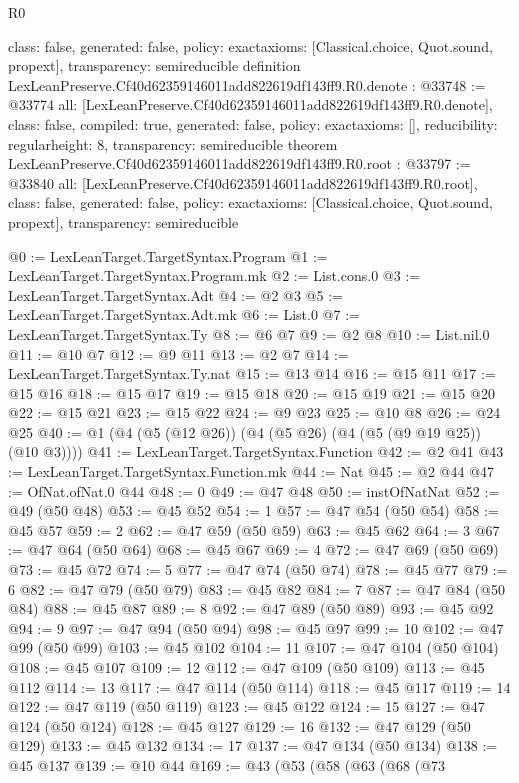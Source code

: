 \begin{lexlean}{R0}
\begin{coremodule}
{  class: false,
  generated: false,
  policy: exact{axioms: [Classical.choice, Quot.sound, propext]},
  transparency: semireducible
}
definition LexLeanPreserve.Cf40d62359146011add822619df143ff9.R0.denote : @33748 := @33774 {
  all: [LexLeanPreserve.Cf40d62359146011add822619df143ff9.R0.denote],
  class: false,
  compiled: true,
  generated: false,
  policy: exact{axioms: []},
  reducibility: regular{height: 8},
  transparency: semireducible
}
theorem LexLeanPreserve.Cf40d62359146011add822619df143ff9.R0.root : @33797 := @33840 {
  all: [LexLeanPreserve.Cf40d62359146011add822619df143ff9.R0.root],
  class: false,
  generated: false,
  policy: exact{axioms: [Classical.choice, Quot.sound, propext]},
  transparency: semireducible
}

@0 := LexLeanTarget.TargetSyntax.Program
@1 := LexLeanTarget.TargetSyntax.Program.mk
@2 := List.cons.{0}
@3 := LexLeanTarget.TargetSyntax.Adt
@4 := @2 @3
@5 := LexLeanTarget.TargetSyntax.Adt.mk
@6 := List.{0}
@7 := LexLeanTarget.TargetSyntax.Ty
@8 := @6 @7
@9 := @2 @8
@10 := List.nil.{0}
@11 := @10 @7
@12 := @9 @11
@13 := @2 @7
@14 := LexLeanTarget.TargetSyntax.Ty.nat
@15 := @13 @14
@16 := @15 @11
@17 := @15 @16
@18 := @15 @17
@19 := @15 @18
@20 := @15 @19
@21 := @15 @20
@22 := @15 @21
@23 := @15 @22
@24 := @9 @23
@25 := @10 @8
@26 := @24 @25
@40 := @1 (@4 (@5 (@12 @26)) (@4 (@5 @26) (@4 (@5 (@9 @19 @25)) (@10 @3))))
@41 := LexLeanTarget.TargetSyntax.Function
@42 := @2 @41
@43 := LexLeanTarget.TargetSyntax.Function.mk
@44 := Nat
@45 := @2 @44
@47 := OfNat.ofNat.{0} @44
@48 := 0
@49 := @47 @48
@50 := instOfNatNat
@52 := @49 (@50 @48)
@53 := @45 @52
@54 := 1
@57 := @47 @54 (@50 @54)
@58 := @45 @57
@59 := 2
@62 := @47 @59 (@50 @59)
@63 := @45 @62
@64 := 3
@67 := @47 @64 (@50 @64)
@68 := @45 @67
@69 := 4
@72 := @47 @69 (@50 @69)
@73 := @45 @72
@74 := 5
@77 := @47 @74 (@50 @74)
@78 := @45 @77
@79 := 6
@82 := @47 @79 (@50 @79)
@83 := @45 @82
@84 := 7
@87 := @47 @84 (@50 @84)
@88 := @45 @87
@89 := 8
@92 := @47 @89 (@50 @89)
@93 := @45 @92
@94 := 9
@97 := @47 @94 (@50 @94)
@98 := @45 @97
@99 := 10
@102 := @47 @99 (@50 @99)
@103 := @45 @102
@104 := 11
@107 := @47 @104 (@50 @104)
@108 := @45 @107
@109 := 12
@112 := @47 @109 (@50 @109)
@113 := @45 @112
@114 := 13
@117 := @47 @114 (@50 @114)
@118 := @45 @117
@119 := 14
@122 := @47 @119 (@50 @119)
@123 := @45 @122
@124 := 15
@127 := @47 @124 (@50 @124)
@128 := @45 @127
@129 := 16
@132 := @47 @129 (@50 @129)
@133 := @45 @132
@134 := 17
@137 := @47 @134 (@50 @134)
@138 := @45 @137
@139 := @10 @44
@169 := @43
    (@53
      (@58
        (@63
          (@68
            (@73

\end{coremodule}
\end{lexlean}
